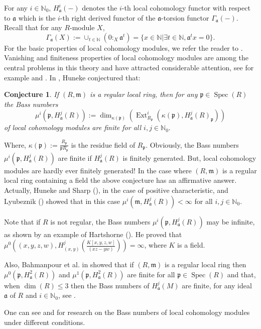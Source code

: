 \documentclass[12pt,twoside, final]{amsart}
\numberwithin{equation}{section}
\newtheorem{con}[thm]{Conjecture}
\newtheorem{nota rem}[thm]{Notation and Remark}
\newtheorem{defen rem}[thm]{Definition and Remark}
\def\Ext{\operatorname{Ext}}
\def\Spec{\operatorname{Spec}}
\def\dim{\operatorname{dim}}
\newcommand{\p}{\mathfrak{p}}
\newcommand{\fa}{\mathfrak{a}}
\newcommand{\m}{\mathfrak{m}}
\newcommand{\NN}{\mathbb{N}}
\begin{document}
For any $i\in \NN_0$, $H^i_{\fa}(-)$ denotes the $i$-th local cohomology functor with respect to $\fa$ which is the $i$-th right derived functor of the $\fa$-torsion functor $\Gamma_{\fa}(-)$. Recall that for any $R$-module $X$,
 \[\Gamma_{\fa}(X):= \cup_{t\in \NN} (0:_X \fa^t)= \{x\in \NN| \exists t\in \NN, \fa^t x=0\}.\]
 For the basic properties of local cohomology modules, we refer the reader to \cite{bsh}.  
Vanishing and finiteness properties of local cohomology modules  are among the central problems in this theory and have attracted considerable attention, see for example \cite{al, dnt, hu1, l}  and \cite{o}.
In \cite{hu1}, Huneke conjectured that:
 \begin{con}\label{conj}
     If $(R, \m)$ is a regular local ring, then for any $\p\in \Spec(R)$ the Bass numbers \[\mu^i(\p, H^j_{\fa}(R)):= \dim_{\kappa(\p)}(\Ext^i_{R_{\p}}(\kappa(\p), H^j_{\fa}(R)_{\p}))\] of local cohomology modules are finite for all $i, j \in \NN_0.$
 \end{con}
 Where,  $\kappa(\p):= \tfrac{R_{\p}}{\p R_{\p}}$ is the residue field of $R_{\p}$. Obviously, the Bass numbers $\mu^i(\p, H^j_{\fa}(R))$ are finite if $H^j_{\fa}(R)$ is finitely generated. But, local cohomology modules are hardly ever finitely generated!
In the case where $(R, \m)$ is a regular local ring containing a field the above conjecture has an affirmative answer. Actually,   Huneke and Sharp (\cite{hu}), in the case of positive characteristic, and Lyubeznik (\cite{lyu2})  showed that in this case $\mu^i(\m, H^j_{\fa}(R))< \infty$ for all   $i, j \in \NN_0.$

Note that if $R$ is not regular, the Bass numbers  $\mu^i(\p, H^j_{\fa}(R))$ may be infinite, as shown by an example of Hartshorne (\cite{ha}). He proved that  $\mu^0((x, y, z, w), H^j_{(x, y)}(\tfrac{K[x, y, z, w]}{(xz- yw)}))= \infty$, where $K$ is a field. 

Also, Bahmanpour et  al. in \cite{bns}   showed that if $(R, \m)$ is a regular local ring then $\mu^0(\p, H^2_{\fa}(R))$ and $\mu^1(\p, H^2_{\fa}(R))$ are finite for all $\p\in \Spec(R)$ and that,  when $\dim(R)\leq 3$ then  the Bass numbers of $ H^j_{\fa}(M)$ are finite, for any ideal $\fa$ of $R$ and   $i\in \NN_0$, see \cite{ba}. 

One can see \cite{al, he}  and \cite{yan} for research on the Bass numbers of local cohomology modules under different conditions.
\end{document}
